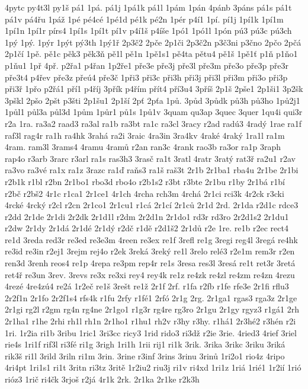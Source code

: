 4pytc
py4t3l
py1š
pá1
1pá.
pá1j
1pá1k
pá1l
1pám
1pán
4pánb
3páns
pá1s
pá1t
pá1v
pá4řu
1páž
1pé
pé4cé
1pé1d
pé1k
pé2n
1pér
p4í1
1pí.
pí1j
1pí1k
1pí1m
1pí1n
1pí1r
pírs4
1pí1s
1pí1t
pí1v
p4í1š
p4íše
1pó1
1pó1l
1pón
pú3
pú3c
pú3ch
1pý
1pý.
1pýr
1pýt
pý3th
1pý1ř
2p3č2
2pče
2p1či
2p3č2n
p3č3ni
p3čno
2pčo
2pčá
2p1čí
1pě.
pě1c
pěk3
pěk3ň
pě1l
pě1n
1pě1s1
pě4ta
pětu4
pě1š
1pě1ť
p1ň
p1ňo1
p1ňu1
1př
4př.
p2řa1
p4řan
1p2ře1
pře3e
pře3j
pře3l
pře3m
pře3o
pře3p
pře3r
pře3t4
p4řev
pře3z
přeú4
pře3č
1při3
při3c
při3h
při3j
při3l
při3m
při3o
při3p
při3ř
1přo
p2řá1
pří1
p4říj
3přík
p4řím
přít4
pří3u4
3příš
2p1š
2pše1
2p1ši1
3p2šk
3pškl
2pšo
2pšt
p3šti
2p1šu1
2p1ší
2pť
2pťa
1pů.
3půd
3půdk
pů3h
pů3ho
1pů2j1
1půl1
půl3a
půl3d
1pům
1půr1
pů1s
1pů1v
3quam
qu3ap
3quec
3quer
1qu4i
qui3r
r2a
1ra.
ra3a2
raad3
ra3al
ra1b
ra3bt
ra1c
ra3cl
3racy
r2ad
radú3
4radý
1rae
ra1f
raf3l
rag4r
ra1h
ra4hk
3rahá
ra2i
3raic
4ra3in
3ra4kv
4raké
4raký
1ra1l
ra1m
4ram.
ram3l
3rams4
4ramu
4ramů
r2an
ran3c
4rank
rao3b
ra3or
ra1p
3raph
rap4o
r3arb
3rarc
r3arl
ra1s
ras3h3
3rasč
ra1t
3ratl
4ratr
3ratý
rat3ř
ra2u1
r2av
ra3vo
ra3vé
ra1x
ra1z
3razc
ra1ď
raňs3
ra1š
raš3t
2r1b
2r1ba1
rba4u
2r1be
2r1bi
r2b1k
r1bl
r2bn
2r1bo1
rbo3d
rbo4o
r2b1s2
r3bt
r3bte
2r1bu
r1by
2r1bá
r1bí
r2bč
r2bš2
4r1c
r1ca1
2r1ce1
4r1ch
4rcha
rch3m
4rchá
2r1ci
rci3k
4r2ck
r3cki
4rcké
4rcký
r2cl
r2cn
2r1co1
2r1cu1
r1cá
2r1cí
2r1ců
2r1d
2rd.
2r1da
r2d1c
rdce3
r2dd
2r1de
2r1di
2r2dk
2r1d1l
r2dm
2r2d1n
2r1do1
rd3r
rd3ro
2r2d1s2
2r1du1
r2dw
2r1dy
2r1dá
2r1dé
2r1dý
r2dč
r1dě
r2d1š2
2r1dů
r2e
1re.
re1b
r2ec
rect4
re1d
3reda
red3r
re3ed
re3e3m
4reen
re3ex
re1f
3refl
re1g
3regi
reg4l
3regá
re4hk
re3id
re3in
r2ej1
3rejm
rej4o
r2ek
3reká
3reký
re1l
3relo
relé3
r2e1m
rem3r
r2en
ren3d
3renh
reos4
re1p
4repa
re3pm
rep4r
re1s
3resa
res3l
3resá
re1t
ret3r
3retá
ret4ř
re3un
3rev.
3revs
re3x
re3xi
rey4
rey4k
re1z
re4zk
re4zl
re4zm
re4zn
4rezu
4rezé
4re4zú4
re2á
1r2eč
re1š
3rešt
re1ž
2r1f
2rf.
r1fa
r2fb
r1fe
rfe3e
2r1fi
rflu3
2r2f1n
2r1fo
2r2f1s4
rfs4k
r1fu
2rfy
r1fé1
2rfó
2r1g
2rg.
2r1ga1
rgas3
rga3z
2r1ge
2r1gi
rg2l
r2gm
rg4n
rg4ne
2r1go1
r1g3r
rg4re
rg3ro
2r1gu
2r1gy
rgyz3
r1gá1
2rh
2r1ha1
r1he
2rhi
rh1l
rh1n
2r1ho1
r1hu1
rh2v
r3hy
r3hy.
r1há1
2r3hé2
r3hén
r2i
1ri.
1r2ia
ri1b
3ribu
1ric1
3ri3cc
ricy3
1rid
rido3
ri3dž
r2ie
3rie.
4ried3
4rief
3riel
rie4s
1ri1f
rif3l
ri3fé
ri1g
3righ
1ri1h
1rii
rij1
ri1k
3rik.
3rika
3rikc
3riku
3riká
rik3š
ri1l
3rild
3riln
ri1m
3rin.
3rine
r3inf
3rins
3rinu
3rinů
1ri2o1
rio4z
4ripo
4ri4pt
1ri1s1
ri1t
3ritn
ri3tz
3ritě
1r2iu2
riu3j
ri1v
ri4xd
1ri1z
1riá
1rié1
1r2ií
1rió
rióz3
1rič
ri4čk
3rjoš
r2já
4r1k
2rk.
2r1ka
2r1ke
r2k3h

